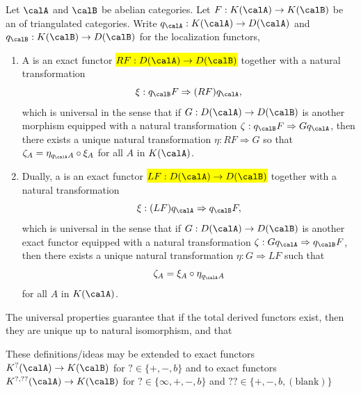 
\begin{definition} \label{definition:total_derived_functor_of_an_exact_functor_between_homotopy_categories_of_abelian_categories}
    Let $\calA$ and $\calB$ be abelian categories. Let $F: K(\calA) \to K(\calB)$ be an  of triangulated categories. Write $q_{\calA}: K(\calA) \to D(\calA)$ and $q_{\calB}: K(\calB) \to D(\calB)$ for the localization functors, 
    \begin{enumerate}
        \item  A  is an exact functor \hl{$RF: D(\calA) \to D(\calB)$} together with a natural transformation 
        $$\xi: q_{\calB} F \Rightarrow (RF)q_{\calA},$$
        which is universal in the sense that if $G: D(\calA) \to D(\calB)$ is another morphism equipped with a natural transformation $\zeta: q_{\calB} F \Rightarrow G q_{\calA}$, then there exists a unique natural transformation $\eta: RF \Rightarrow G$ so that $\zeta_A = \eta_{q_{\calA} A} \circ \xi_A$ for all $A$ in $K(\calA)$.

        \item Dually, a  is an exact functor \hl{$LF: D(\calA) \to D(\calB)$} together with a natural transformation 
        $$\xi: (LF) q_{\calA} \Rightarrow q_{\calB} F,$$
        which is universal in the sense that if $G: D(\calA) \to D(\calB)$ is another exact functor equipped with a natural transformation $\zeta: G q_{\calA} \Rightarrow q_{\calB} F$, then there exists a unique natural transformation $\eta: G \Rightarrow LF$ such that
        \[
        \zeta_A = \xi_A \circ \eta_{q_{\calA} A}
        \]
        for all $A$ in $K(\calA)$.
    \end{enumerate}
    The universal properties guarantee that if the total derived functors exist, then they are unique up to natural isomorphism, and that 

    These definitions/ideas may be extended to exact functors $K^{?}(\calA) \to K(\calB)$ for $? \in \{+,-,b\}$ and to exact functors $K^{?,??}(\calA) \to K(\calB)$ for $? \in \{\infty, +,-,b\}$ and $?? \in \{+,-,b,(\text{blank})\}$


\end{definition}
